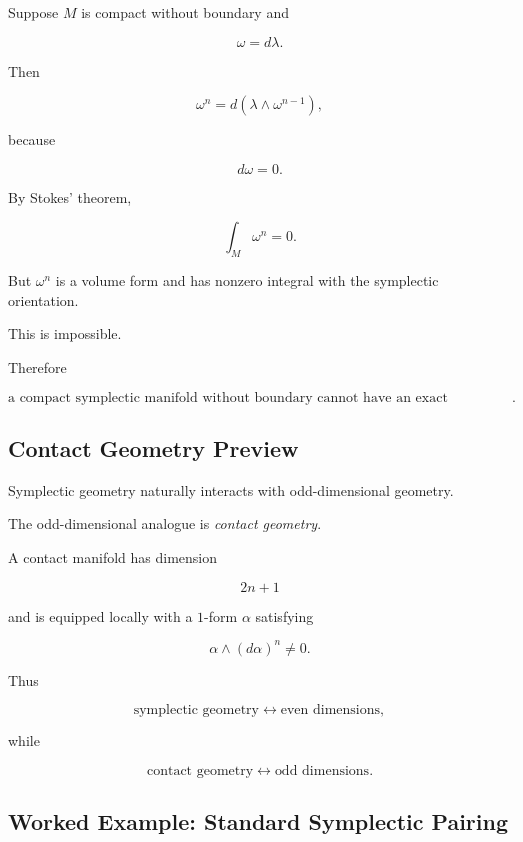 Suppose \(M\) is compact without boundary and

\[
\omega=d\lambda.
\]

Then

\[
\omega^n
=
d(\lambda\wedge\omega^{n-1}),
\]

because

\[
d\omega=0.
\]

By Stokes' theorem,

\[
\int_M\omega^n=0.
\]

But \(\omega^n\) is a volume form and has nonzero integral with the
symplectic orientation.

This is impossible.

Therefore

\[
\boxed{
\text{a compact symplectic manifold without boundary cannot have an exact
symplectic form}.
}
\]

\subsection{Contact Geometry Preview}
\label{subsec:contact-geometry-preview}

Symplectic geometry naturally interacts with odd-dimensional geometry.

The odd-dimensional analogue is \emph{contact geometry}.

A contact manifold has dimension

\[
\boxed{2n+1}
\]

and is equipped locally with a \(1\)-form \(\alpha\) satisfying

\[
\boxed{
\alpha\wedge(d\alpha)^n\neq0.
}
\]

Thus

\[
\boxed{
\text{symplectic geometry}
\leftrightarrow
\text{even dimensions},
}
\]

while

\[
\boxed{
\text{contact geometry}
\leftrightarrow
\text{odd dimensions}.
}
\]

\subsection{Worked Example: Standard Symplectic Pairing}
\label{subsec:worked-symplectic-pairing}

